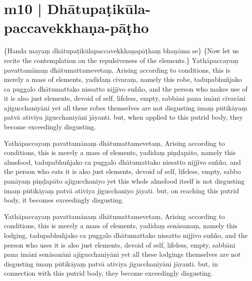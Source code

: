 \section*{m10 | Dhātupaṭikūla-paccavekkhaṇa-pāṭho}

\begin{chantsubsection}
  \chantnote
    {\{Handa mayaṃ dhātupaṭikūlapaccavekkhaṇapāṭhaṃ bhaṇāma se\}}
  \chantnotetrans
    {\{Now let us recite the contemplation on the repulsiveness of the elements.\}}
\chantgap
  \chantlineinline
    {Yathāpaccayaṃ pavattamānaṃ dhātumattamevetaṃ,}
    {Arising according to conditions, this is merely a mass of elements,}
  \chantlineinline
    {yadidaṃ cīvaraṃ,}
    {namely this robe,}
  \chantlineinline
    {tadupabhuñjako ca puggalo dhātumattako nissatto nijjīvo suñño,}
    {and the person who makes use of it is also just elements, devoid of self, lifeless, empty,}
  \chantlineinline
    {sabbāni pana imāni cīvarāni ajigucchaniyāni}
    {yet all these robes themselves are not disgusting}
  \chantlineinline
    {imaṃ pūtikāyaṃ patvā ativiya jigucchaniyāni jāyanti.}
    {but, when applied to this putrid body, they become exceedingly disgusting.}
\end{chantsubsection}
\chantgap
\begin{chantsubsection}
  \chantlineinline
    {Yathāpaccayaṃ pavattamānaṃ dhātumattamevetaṃ,}
    {Arising according to conditions, this is merely a mass of elements,}
  \chantlineinline
    {yadidaṃ piṇḍapāto,}
    {namely this almsfood,}
  \chantlineinline
    {tadupabhuñjako ca puggalo dhātumattako nissatto nijjīvo suñño,}
    {and the person who eats it is also just elements, devoid of self, lifeless, empty,}
  \chantlineinline
    {sabbo panāyaṃ piṇḍapāto ajigucchaniyo}
    {yet this whole almsfood itself is not disgusting}
  \chantlineinline
    {imaṃ pūtikāyaṃ patvā ativiya jigucchaniyo jāyati.}
    {but, on reaching this putrid body, it becomes exceedingly disgusting.}
\end{chantsubsection}
\chantgap
\begin{chantsubsection}
  \chantlineinline
    {Yathāpaccayaṃ pavattamānaṃ dhātumattamevetaṃ,}
    {Arising according to conditions, this is merely a mass of elements,}
  \chantlineinline
    {yadidaṃ senāsanaṃ,}
    {namely this lodging,}
  \chantlineinline
    {tadupabhuñjako ca puggalo dhātumattako nissatto nijjīvo suñño,}
    {and the person who uses it is also just elements, devoid of self, lifeless, empty,}
  \chantlineinline
    {sabbāni pana imāni senāsanāni ajigucchaniyāni}
    {yet all these lodgings themselves are not disgusting}
  \chantlineinline
    {imaṃ pūtikāyaṃ patvā ativiya jigucchaniyāni jāyanti.}
    {but, in connection with this putrid body, they become exceedingly disgusting.}
\end{chantsubsection}
